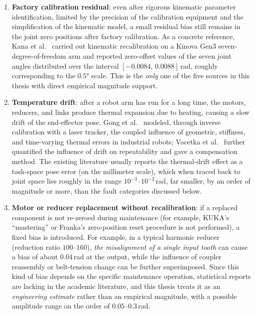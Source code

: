 \begin{enumerate}
  \item \textbf{Factory calibration residual}: even after rigorous kinematic parameter identification, limited by the precision of the calibration equipment and the simplification of the kinematic model, a small residual bias still remains in the joint zero positions after factory calibration. As a concrete reference, Kana et al.~\cite{kana2022fast} carried out kinematic recalibration on a Kinova Gen3 seven-degree-of-freedom arm and reported zero-offset values of the seven joint angles distributed over the interval $[-0.0084,\,0.0088]$\,rad, roughly corresponding to the $0.5°$ scale. This is the \emph{only} one of the five sources in this thesis with direct empirical magnitude support.

  \item \textbf{Temperature drift}: after a robot arm has run for a long time, the motors, reducers, and links produce thermal expansion due to heating, causing a slow drift of the end-effector pose. Gong et al.~\cite{gong2000nongeometric} modeled, through inverse calibration with a laser tracker, the coupled influence of geometric, stiffness, and time-varying thermal errors in industrial robots; Vocetka et al.~\cite{vocetka2021influence} further quantified the influence of drift on repeatability and gave a compensation method. The existing literature usually reports the thermal-drift effect as a task-space pose error (on the millimeter scale), which when traced back to joint space lies roughly in the range $10^{-3}$--$10^{-2}$\,rad, far smaller, by an order of magnitude or more, than the fault categories discussed below.

  \item \textbf{Motor or reducer replacement without recalibration}: if a replaced component is not re-zeroed during maintenance (for example, KUKA's ``mastering'' or Franka's zero-position reset procedure is not performed), a fixed bias is introduced. For example, in a typical harmonic reducer (reduction ratio $100$--$160$), \emph{the misalignment of a single input tooth} can cause a bias of about $0.04$\,rad at the output, while the influence of coupler reassembly or belt-tension change can be further superimposed. Since this kind of bias depends on the specific maintenance operation, statistical reports are lacking in the academic literature, and this thesis treats it as an \emph{engineering estimate} rather than an empirical magnitude, with a possible amplitude range on the order of $0.05$--$0.3$\,rad.


\end{enumerate}
